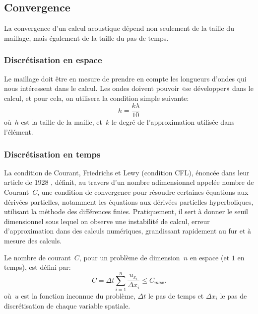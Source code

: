 


\medskip
\subsection{Convergence}

La convergence d'un calcul acoustique dépend non seulement de la taille du maillage, mais également de la taille du pas de temps.

\medskip
\subsubsection{Discrétisation en espace}
Le maillage doit être en mesure de prendre en compte les longueurs d'ondes qui nous intéressent dans le calcul. Les ondes doivent pouvoir «se développer» dans le calcul, et pour cela, on utilisera la condition simple suivante:
\begin{equation}
h=\dfrac{k\lambda}{10}
\end{equation}
où~$h$ est la taille de la maille, et~$k$ le degré de l'approximation utilisée dans l'élément.

\medskip
\subsubsection{Discrétisation en temps}

La condition de Courant, Friedrichs et Lewy (condition CFL), énoncée dans leur article de 1928 \cite{bib-CFL}, définit, au travers d'un nombre adimensionnel appelée nombre de Courant~$C$, une condition de convergence pour résoudre certaines équations aux dérivées partielles, notamment les équations aux dérivées partielles hyperboliques, utilisant la méthode des différences finies. Pratiquement, il sert à donner le seuil dimensionnel sous lequel on observe une instabilité de calcul, erreur d'approximation dans des calculs numériques, grandissant rapidement au fur et à mesure des calculs. 

\medskip
Le nombre de courant~$C$, pour un problème de dimension~$n$ en espace (et $1$ en temps), est défini par:
\begin{equation}
C = \Delta t \sum_{i=1}^n\frac{u_{x_i}}{\Delta x_i} \leq C_{max}. 
\end{equation}
où~$u$ est la fonction inconnue du problème, $\Delta t$ le pas de temps et $\Delta x_i$ le pas de discrétisation de chaque variable spatiale.

